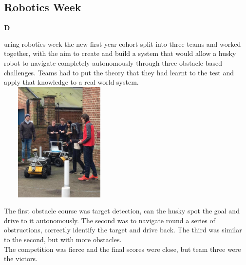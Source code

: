 \documentclass[10pt,final]{papertex}
\begin{document}
\begin{frontpage}
\section*{Robotics Week}
\noindent
\begin{multicols}{2}
	\noindent\textbf{D}\large{uring robotics week the new first year cohort split into three teams and worked together, with the aim to create and build a system that would allow a husky robot to navigate completely autonomously through three obstacle based challenges.
	Teams had to put the theory that they had learnt to the test and apply that knowledge to a real world system.\\
	
	\includegraphics[width=6cm,height=6cm,keepaspectratio]{img/robots}
    
    \noindent The first obstacle course was target detection, can the husky spot the goal and drive to it autonomously. The second was to navigate round a series of obstructions, correctly identify the target and drive back.  The third was similar to the second, but with more obstacles.\\
    
    \noindent The competition was fierce and the final scores were close, but team three were the victors.\\
     
}
\end{multicols}
\end{frontpage}
\end{document}
